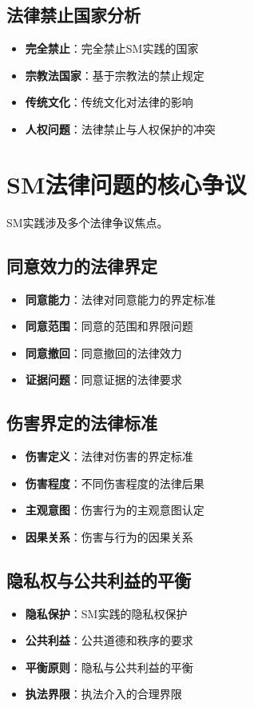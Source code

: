 \documentclass[12pt,UTF8]{ctexbook}
\begin{document}
\subsection{法律禁止国家分析}
\begin{itemize}[leftmargin=2cm]
	\item \textbf{完全禁止}：完全禁止SM实践的国家
	\item \textbf{宗教法国家}：基于宗教法的禁止规定
	\item \textbf{传统文化}：传统文化对法律的影响
	\item \textbf{人权问题}：法律禁止与人权保护的冲突
\end{itemize}

\section{SM法律问题的核心争议}
SM实践涉及多个法律争议焦点。

\subsection{同意效力的法律界定}
\begin{itemize}[leftmargin=2cm]
	\item \textbf{同意能力}：法律对同意能力的界定标准
	\item \textbf{同意范围}：同意的范围和界限问题
	\item \textbf{同意撤回}：同意撤回的法律效力
	\item \textbf{证据问题}：同意证据的法律要求
\end{itemize}

\subsection{伤害界定的法律标准}
\begin{itemize}[leftmargin=2cm]
	\item \textbf{伤害定义}：法律对伤害的界定标准
	\item \textbf{伤害程度}：不同伤害程度的法律后果
	\item \textbf{主观意图}：伤害行为的主观意图认定
	\item \textbf{因果关系}：伤害与行为的因果关系
\end{itemize}

\subsection{隐私权与公共利益的平衡}
\begin{itemize}[leftmargin=2cm]
	\item \textbf{隐私保护}：SM实践的隐私权保护
	\item \textbf{公共利益}：公共道德和秩序的要求
	\item \textbf{平衡原则}：隐私与公共利益的平衡
	\item \textbf{执法界限}：执法介入的合理界限
\end{itemize}
\end{document}
